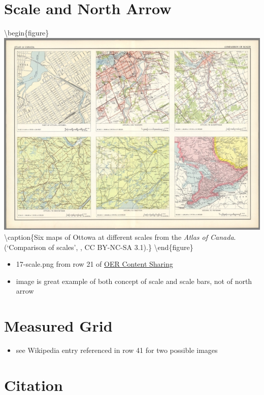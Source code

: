 \documentclass[
]{book}
\providecommand{\tightlist}{%
  \setlength{\itemsep}{0pt}\setlength{\parskip}{0pt}}
\begin{document}
\hypertarget{scale-and-north-arrow}{%
\section{Scale and North Arrow}\label{scale-and-north-arrow}}

\textbackslash begin\{figure\}
\includegraphics[width=0.8\linewidth]{images/17-scale} \textbackslash caption\{Six maps of Ottowa at different scales from the \emph{Atlas of Canada}. (`Comparison of scales', \citet{nicholson_comparison_1958}, CC BY-NC-SA 3.1).\}\label{fig:17-scale}
\textbackslash end\{figure\}

\begin{itemize}
\tightlist
\item
  17-scale.png from row 21 of \href{https://docs.google.com/spreadsheets/d/1LqzXn00wMeIjHWstNT3tMImNDZirLGc3g72jFOQc_8I/edit\#gid=817407192}{OER Content Sharing}
\item
  image is great example of both concept of scale and scale bars, not of north arrow
\end{itemize}

\hypertarget{measured-grid}{%
\section{Measured Grid}\label{measured-grid}}

\begin{itemize}
\tightlist
\item
  see Wikipedia entry referenced in row 41 for two possible images
\end{itemize}

\hypertarget{citation}{%
\section{Citation}\label{citation}}
\end{document}

